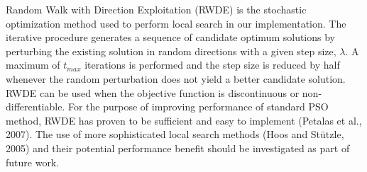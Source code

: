 Random Walk with Direction Exploitation (RWDE) is the stochastic optimization method used to perform local search in our implementation. The iterative procedure generates a sequence of candidate optimum solutions by perturbing the existing solution in random directions with a given step size, $\lambda$. A maximum of $t_{max}$ iterations is performed and the step size is reduced by half whenever the random perturbation does not yield a better candidate solution.\\

RWDE can be used when the objective function is discontinuous or non-differentiable. For the purpose of improving performance of standard PSO method, RWDE has proven to be sufficient and easy to implement (Petalas et al., 2007). The use of more sophisticated local search methods (Hoos and St{\"u}tzle, 2005) and their potential performance benefit should be investigated as part of future work.

\newpage

